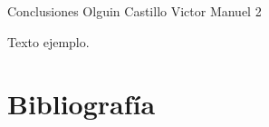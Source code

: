 \documentclass[12pt,twoside]{article}
\begin{document}
\medskip

Conclusiones Olguin Castillo Victor Manuel 2
\par
Texto ejemplo.

\newpage
\section{Bibliograf\'ia}

\printbibliography[title={ }]
\end{document}
